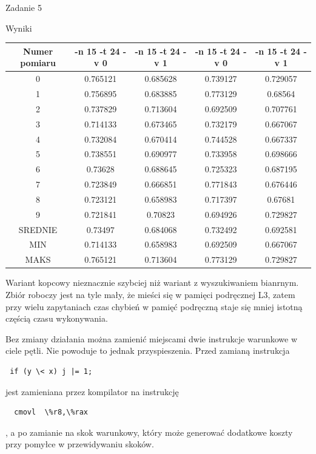 \documentclass[11pt,wide]{mwart}
\begin{document}
\begin{section}{Zadanie 5}
\begin{subsection}{Wyniki}
\begin{center}
\begin{tabular}{|c|c|c|c|c|}
\hline
Numer pomiaru & -n 15 -t 24 -v 0 & -n 15 -t 24 -v 1 & -n 15 -t 24 -v 0 & -n 15 -t 24 -v 1\\
\hline
0 & 0.765121 & 0.685628 & 0.739127 & 0.729057\\
\hline
1 & 0.756895 & 0.683885 & 0.773129 & 0.68564\\
\hline
2 & 0.737829 & 0.713604 & 0.692509 & 0.707761\\
\hline
3 & 0.714133 & 0.673465 & 0.732179 & 0.667067\\
\hline
4 & 0.732084 & 0.670414 & 0.744528 & 0.667337\\
\hline
5 & 0.738551 & 0.690977 & 0.733958 & 0.698666\\
\hline
6 & 0.73628 & 0.688645 & 0.725323 & 0.687195\\
\hline
7 & 0.723849 & 0.666851 & 0.771843 & 0.676446\\
\hline
8 & 0.723121 & 0.658983 & 0.717397 & 0.67681\\
\hline
9 & 0.721841 & 0.70823 & 0.694926 & 0.729827\\
\hline
SREDNIE & 0.73497 & 0.684068 & 0.732492 & 0.692581\\
\hline
MIN & 0.714133 & 0.658983 & 0.692509 & 0.667067\\
\hline
MAKS & 0.765121 & 0.713604 & 0.773129 & 0.729827\\
\hline
\end{tabular}
\end{center}


Wariant kopcowy nieznacznie szybciej niż wariant z wyszukiwaniem bianrnym. Zbiór roboczy jest na tyle mały,  że mieści się w pamięci podręcznej L3, zatem przy wielu zapytaniach czas chybień w pamięć podręczną staje się mniej istotną częścią czasu wykonywania. 

Bez zmiany działania można zamienić miejscami dwie instrukcje warunkowe w ciele pętli. Nie powoduje to jednak przyspieszenia. Przed zamianą instrukcja
\begin{lstlisting}
 if (y \< x) j |= 1; 
 \end{lstlisting}jest zamieniana przez kompilator na instrukcję
 \begin{lstlisting}
  cmovl  \%r8,\%rax
  \end{lstlisting}, a po zamianie na skok warunkowy, który może generować dodatkowe koszty przy pomyłce w przewidywaniu skoków. 

\end{subsection}
\end{section}
\end{document}
